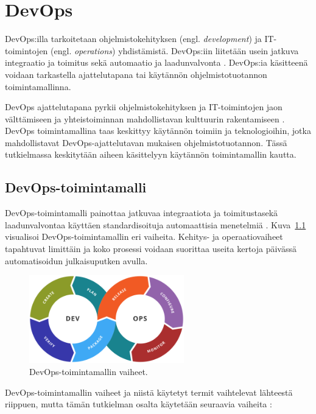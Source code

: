 \chapter{DevOps\label{devops}}

DevOps:illa tarkoitetaan ohjelmistokehityksen (engl. \textit{development}) ja IT-toimintojen (engl. \textit{operations}) yhdistämistä.
DevOps:iin liitetään usein jatkuva integraatio ja toimitus sekä automaatio ja laadunvalvonta \cite{Jabbari16, Leite19}.
DevOps:ia käsitteenä voidaan tarkastella ajattelutapana tai käytännön ohjelmistotuotannon toimintamallinna.

DevOps ajattelutapana pyrkii ohjelmistokehityksen ja IT-toimintojen jaon välttämiseen ja yhteistoiminnan mahdollistavan kulttuurin rakentamiseen \cite{Klein21}.
DevOps toimintamallina taas keskittyy käytännön toimiin ja teknologioihin, jotka mahdollistavat DevOps-ajattelutavan mukaisen ohjelmistotuotannon.
Tässä tutkielmassa keskitytään aiheen käsittelyyn käytännön toimintamallin kautta.

\section{DevOps-toimintamalli}

DevOps-toimintamalli painottaa jatkuvaa integraatiota ja toimitustasekä laadunvalvontaa käyttäen standardisoituja automaattisia menetelmiä \cite{Leite19}.
Kuva~\ref{fig:devops} visualisoi DevOps-toimintamallin eri vaiheita.
Kehitys- ja operaatiovaiheet tapahtuvat limittäin ja koko prosessi voidaan suorittaa useita kertoja päivässä automatisoidun julkaisuputken avulla.

\begin{figure}[ht]
\begin{center}
\includegraphics[width=0.6\textwidth]{figures/devops_toolchain.png}
\caption{DevOps-toimintamallin vaiheet.\cite{Wikimedia23}\label{fig:devops}}
\end{center}
\end{figure}

DevOps-toimintamallin vaiheet ja niistä käytetyt termit vaihtelevat lähteestä riippuen, mutta tämän tutkielman osalta käytetään seuraavia vaiheita \cite{Alnafessah21}:


